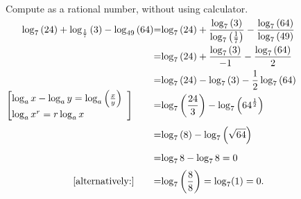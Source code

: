 \begin{frame}
\begin{example}
Compute as a rational number, without using calculator. 
$
\renewcommand{\arraystretch}{2}
\begin{array}{@{}r@{}c@{}l@{}l|l}
\displaystyle \log_{7}{(24)}+\log_{\frac{1}{7}}{(3)}-\log_{49}{(64)}&=&\displaystyle  \log_{7}{(24)}+ \frac{\log_{7}{(3)}}{ \log_{7}{\left(\frac{1}{7}\right)}}- \frac{\log_{7}{ (64)}}{\log_{7}{(49)}} \\
&=&\displaystyle \log_{7}{(24)}+ \frac{\log_{7}{(3)}}{-1} -\frac{\log_{7}{(64)}}{2}\\
&=&\displaystyle \log_{7}{(24)}-\log_{7}{(3)}-\frac{1}{2}\log_{7}{(64)}\\
\renewcommand{\arraystretch}{1.2} \left[ \begin{array}{@{}l} \log_ax-\log_ay=\log_a\left( \frac{x}{y}\right)  \\ \log_ax^r=r\log_ax \end{array}\right] {~~~~~~} &=&\displaystyle \log_{7}{\left(\frac{24}{3}\right)}- \log_{7}{ \left(64^{ \frac{ 1}{2}}\right) }\\
&=&\displaystyle \log_{7}{\left(8\right)}-\log_{7}\left(\sqrt{64} \right)\\
&=&\displaystyle \log_78-\log_78 =0\\
~[\text{alternatively:}] {~~~~~~} &=&\displaystyle \log_7\left(\frac{8}{8}\right)=\displaystyle \log_7(1)=0.
\end{array}
$

\end{example}
\end{frame}